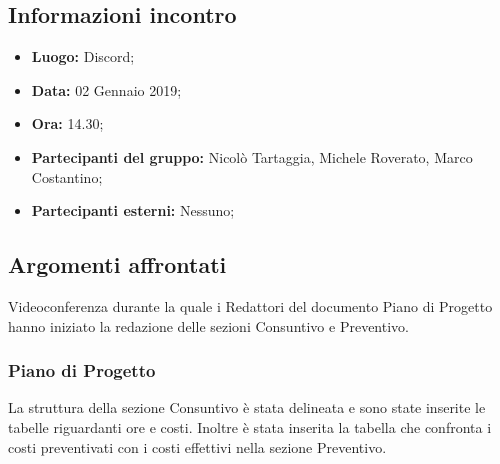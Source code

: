 \subsection{Informazioni incontro}
\begin{itemize}
	\item { \textbf{Luogo:} Discord;  }
	\item { \textbf{Data:} 02 Gennaio 2019; }
	\item { \textbf{Ora:} 14.30; }
	\item { \textbf{Partecipanti del gruppo:} Nicolò Tartaggia, Michele Roverato, Marco Costantino;}
	\item { \textbf{Partecipanti esterni:} Nessuno; }
\end{itemize}


\subsection{Argomenti affrontati}
Videoconferenza durante la quale i Redattori del documento Piano di Progetto hanno iniziato la redazione delle sezioni Consuntivo e Preventivo.

\subsubsection{Piano di Progetto}
La struttura della sezione Consuntivo è stata delineata e sono state inserite le tabelle riguardanti ore e costi. Inoltre è stata inserita la tabella che confronta i costi preventivati con i costi effettivi nella sezione Preventivo.
